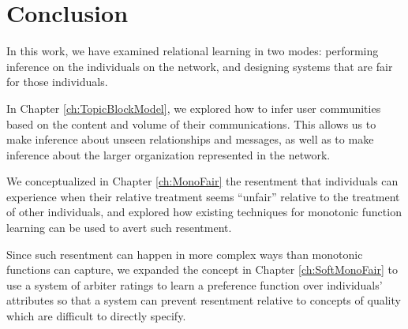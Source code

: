 \chapter{Conclusion}

In this work, we have examined relational learning in two modes: performing inference on the individuals on the network, and designing systems that are fair for those individuals. 

In Chapter \ref{ch:TopicBlockModel}, we explored how to infer user communities based on the content and volume of their communications. This allows us to make inference about unseen relationships and messages, as well as to make inference about the larger organization represented in the network.

We conceptualized in Chapter \ref{ch:MonoFair} the resentment that individuals can experience when their relative treatment seems ``unfair'' relative to the treatment of other individuals, and explored how existing techniques for monotonic function learning can be used to avert such resentment.

Since such resentment can happen in more complex ways than monotonic functions can capture, we expanded the concept in Chapter \ref{ch:SoftMonoFair} to use a system of arbiter ratings to learn a preference function over individuals' attributes so that a system can prevent resentment relative to concepts of quality which are difficult to directly specify.